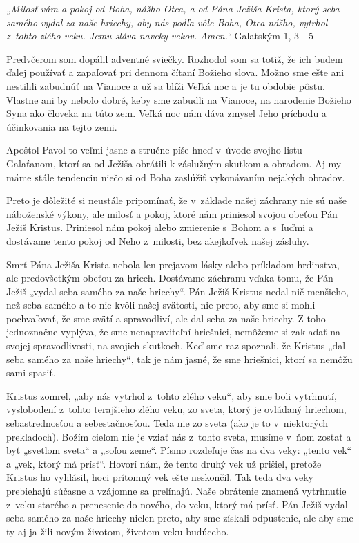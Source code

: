 


{\it „Milosť vám a pokoj od Boha, nášho Otca, a od Pána Ježiša Krista, ktorý seba samého vydal za naše hriechy, aby nás podľa vôle Boha, Otca nášho, vytrhol z~tohto zlého veku. Jemu sláva naveky vekov. Amen.“} Galatským 1, 3 - 5

Predvčerom som dopálil adventné sviečky. Rozhodol som sa totiž, že ich budem ďalej používať a zapaľovať pri dennom čítaní Božieho slova. Možno sme ešte ani nestihli zabudnúť na Vianoce a už sa blíži Veľká noc a je tu obdobie pôstu. Vlastne ani by nebolo dobré, keby sme zabudli na Vianoce, na narodenie Božieho Syna ako človeka na túto zem. Veľká noc nám dáva zmysel Jeho príchodu a účinkovania na tejto zemi.

Apoštol Pavol to veľmi jasne a stručne píše hneď v~úvode svojho listu Galaťanom, ktorí sa od Ježiša obrátili k záslužným skutkom a obradom. Aj my máme stále tendenciu niečo si od Boha zaslúžiť vykonávaním nejakých obradov.

Preto je dôležité si neustále pripomínať, že v~základe našej záchrany nie sú naše náboženské výkony, ale milosť a pokoj, ktoré nám priniesol svojou obeťou Pán Ježiš Kristus. Priniesol nám pokoj alebo zmierenie s~Bohom a s~ľuďmi a dostávame tento pokoj od Neho z~milosti, bez akejkoľvek našej zásluhy.

Smrť Pána Ježiša Krista nebola len prejavom lásky alebo príkladom hrdinstva, ale predovšetkým obeťou za hriech. Dostávame záchranu vďaka tomu, že Pán Ježiš „vydal seba samého za naše hriechy“. Pán Ježiš Kristus nedal nič menšieho, než seba samého a to nie kvôli našej svätosti, nie preto, aby sme si mohli pochvaľovať, že sme svätí a spravodliví, ale dal seba za naše hriechy. Z toho jednoznačne vyplýva, že sme nenapraviteľní hriešnici, nemôžeme si zakladať na svojej spravodlivosti, na svojich skutkoch. Keď sme raz spoznali, že Kristus „dal seba samého za naše hriechy“, tak je nám jasné, že sme hriešnici, ktorí sa nemôžu sami spasiť.

Kristus zomrel, „aby nás vytrhol z~tohto zlého veku“, aby sme boli vytrhnutí, vyslobodení z~tohto terajšieho zlého veku, zo sveta, ktorý je ovládaný hriechom, sebastrednosťou a sebestačnosťou. Teda nie zo sveta (ako je to v~niektorých prekladoch). Božím cieľom nie je vziať nás z~tohto sveta,  musíme v~ňom zostať a byť „svetlom sveta“ a „soľou zeme“. Písmo rozdeľuje čas na dva veky: „tento vek“ a „vek, ktorý má prísť“. Hovorí nám, že tento druhý vek už prišiel, pretože Kristus ho vyhlásil, hoci prítomný vek ešte neskončil. Tak teda dva veky prebiehajú súčasne a vzájomne sa prelínajú. Naše obrátenie znamená vytrhnutie z~veku starého a prenesenie do nového, do veku, ktorý má prísť.  Pán Ježiš vydal seba samého za naše hriechy nielen preto, aby sme získali odpustenie, ale aby sme ty aj ja žili novým životom, životom veku budúceho.

